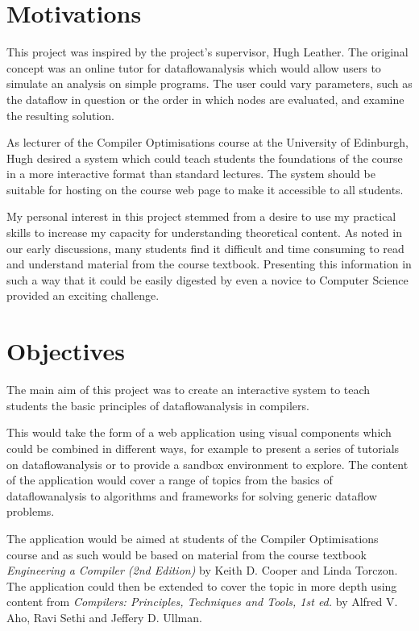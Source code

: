 \documentclass[bsc,twoside,singlespacing,parskip,logo,notimes,normalheadings]{infthesis}
\begin{document}
    \section{Motivations}
    This project was inspired by the project's supervisor, Hugh
    Leather. The original concept was an online tutor for
    \gls{dataflowanalysis} which would allow users to simulate an
    analysis on simple programs. The user could vary parameters, such
    as the \gls{dataflow} in question or the order in which nodes are
    evaluated, and examine the resulting solution.
    
    As lecturer of the Compiler Optimisations course at the University
    of Edinburgh, Hugh desired a system which could teach students the
    foundations of the course in a more interactive format than
    standard lectures. The system should be suitable for hosting on
    the course web page to make it accessible to all students.
    
    My personal interest in this project stemmed from a desire to use
    my practical skills to increase my capacity for understanding
    theoretical content. As noted in our early discussions, many
    students find it difficult and time consuming to read and
    understand material from the course textbook. Presenting this
    information in such a way that it could be easily digested by even
    a novice to Computer Science provided an exciting challenge.
    
    
    \section{Objectives}
    The main aim of this project was to create an interactive system
    to teach students the basic principles of \gls{dataflowanalysis}
    in compilers.
    
    This would take the form of a web application using visual
    components which could be combined in different ways, for example
    to present a series of tutorials on \gls{dataflowanalysis} or to
    provide a sandbox environment to explore. The content of the
    application would cover a range of topics from the basics of
    \gls{dataflowanalysis} to algorithms and frameworks for solving
    generic \gls{dataflow} problems.
    
    The application would be aimed at students of the Compiler
    Optimisations course and as such would be based on material from
    the course textbook {\em Engineering a Compiler (2nd
      Edition)}\cite{eac} by Keith D. Cooper and Linda Torczon. The
    application could then be extended to cover the topic in more
    depth using content from {\em Compilers: Principles, Techniques
      and Tools, 1st ed.}\cite{dragonbook} by Alfred V. Aho, Ravi
    Sethi and Jeffery D. Ullman.
    
\end{document}
